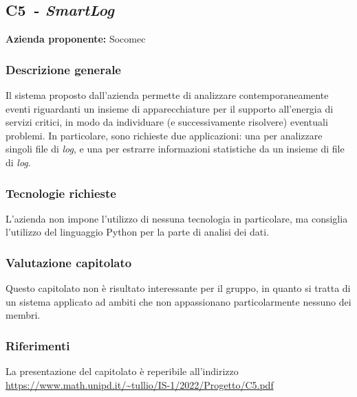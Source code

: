 
\renewcommand{\capName}{\textit{SmartLog}} %
\renewcommand{\capCode}{C5} %
\renewcommand{\capLink}{https://www.math.unipd.it/~tullio/IS-1/2022/Progetto/C5.pdf} %
\renewcommand{\capProposer}{Socomec} %


\subsection{\capCode\ - \capName}
\textbf{Azienda proponente:} Socomec
\subsubsection{Descrizione generale}
Il sistema proposto dall'azienda permette di analizzare contemporaneamente eventi riguardanti un insieme di apparecchiature per il supporto all'energia di servizi critici, in modo da individuare (e successivamente risolvere) eventuali problemi. In particolare, sono richieste due applicazioni: una per analizzare singoli file di \textit{log}, e una per estrarre informazioni statistiche da un insieme di file di \textit{log}.
\subsubsection{Tecnologie richieste}
L'azienda non impone l'utilizzo di nessuna tecnologia in particolare, ma consiglia l'utilizzo del linguaggio Python per la parte di analisi dei dati.
\subsubsection{Valutazione capitolato}
Questo capitolato non è risultato interessante per il gruppo, in quanto si tratta di un sistema applicato ad ambiti che non appassionano particolarmente nessuno dei membri.

\subsubsection{Riferimenti}
La presentazione del capitolato è reperibile all'indirizzo \url{\capLink}